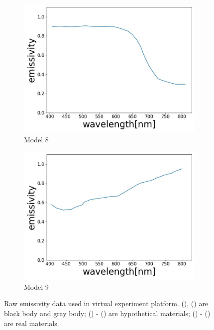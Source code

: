 \begin{figure}[htbp]
    \begin{subfigure}{0.3\linewidth}
      \centering
      \includegraphics[width=\linewidth]{figures/emissivity_32.jpg}
      \caption{Model 8}
      \label{fig: emi_32}
    \end{subfigure}
    \begin{subfigure}{0.3\linewidth}
      \centering
      \includegraphics[width=\linewidth]{figures/emissivity_33.jpg}
      \caption{Model 9}
      \label{fig: emi_33}
    \end{subfigure}
    
    \caption{Raw emissivity data used in virtual experiment platform. (), 
    () are black body and gray body; () - ()
    are hypothetical materials\cite{Wang.2021b}; () - 
    () are real materials\cite{Taunay.2020b}.}
    \label{fig: emi_model}
\end{figure}



